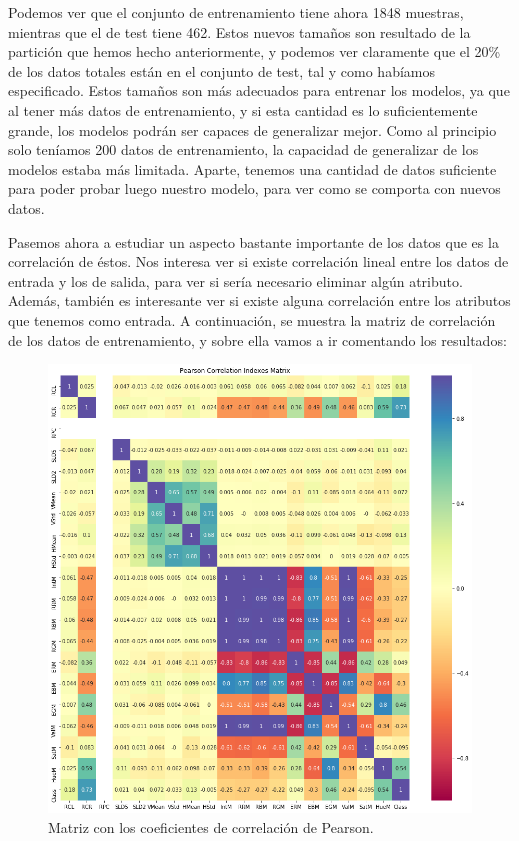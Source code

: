 \documentclass[11pt,a4paper]{article}
\begin{document}
Podemos ver que el conjunto de entrenamiento tiene ahora 1848 muestras, mientras que el de test tiene 462. Estos nuevos tamaños son
resultado de la partición que hemos hecho anteriormente, y podemos ver claramente que el 20\% de los datos totales están en el
conjunto de test, tal y como habíamos especificado. Estos tamaños son más adecuados para entrenar los modelos, ya que al tener más
datos de entrenamiento, y si esta cantidad es lo suficientemente grande, los modelos podrán ser capaces de generalizar mejor. Como
al principio solo teníamos 200 datos de entrenamiento, la capacidad de generalizar de los modelos estaba más limitada. Aparte, tenemos
una cantidad de datos suficiente para poder probar luego nuestro modelo, para ver como se comporta con nuevos datos.

Pasemos ahora a estudiar un aspecto bastante importante de los datos que es la correlación de éstos. Nos interesa ver si existe
correlación lineal entre los datos de entrada y los de salida, para ver si sería necesario eliminar algún atributo. Además, también es
interesante ver si existe alguna correlación entre los atributos que tenemos como entrada. A continuación, se muestra la matriz de
correlación de los datos de entrenamiento, y sobre ella vamos a ir comentando los resultados:

\begin{figure}[H]
    \centering
    \includegraphics[scale=0.4]{img/correlation.png}
    \caption{Matriz con los coeficientes de correlación de Pearson.}
    \label{fig:pearson}
\end{figure}
\end{document}
